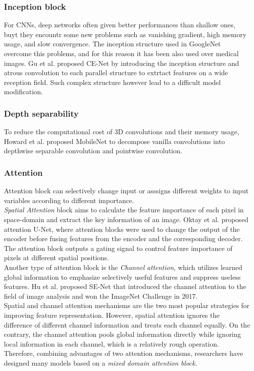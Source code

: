 \subsubsection{Inception block}
For CNNs, deep networks often given better performances than shallow ones, buyt they encountr some new problems such as vanishing gradient, high memory usage, and slow convergence. The inception structure used in GoogleNet overcome this problems, and for this reason it has been also used over medical images. Gu et al. proposed CE-Net by introducing the inception structure and atrous convolution to each parallel structure to extrtact features on a wide reception field. Such complex structure however lead to a difficult model modification.

\subsubsection{Depth separability}
To reduce the computational cost of 3D convolutions and their memory usage,
Howard et al. proposed MobileNet to decompose vanilla convolutions into
depthwise separable convolution and pointwise convolution.

\subsubsection{Attention}
\par
Attention block can selectively change input or asssigns different weights to
input variables according to different importance.\\
\emph{Spatial Attention} block aims
to calculate the feature importance of each pixel in space-domain and extract
the key information of an image. Oktay et al. proposed attention U-Net, where
attention blocks were used to change the output of the encoder before fusing
features from the encoder and the corresponding decoder. The attention block
outputs a gating signal to control feature importance of pixels at different
spatial positions.\\
Another type of attention block is the \emph{Channel attention},
which utilizes learned global information to emphasize selectively useful
features and suppress useless features. Hu et al. proposed SE-Net that
introduced the channel attention to the field of image analysis and won the
ImageNet Challenge in 2017.\\
Spatial and channel attention mechanisms are the two most popular strategies for
improving feature representation. However, spatial attention ignores the
difference of different channel information and treats each channel equally. On
the contrary, the channel attention pools global information directly while
ignoring local information in each channel, which is a relatively rough
operation. Therefore, combining advantages of two attention mechanisms,
researchers have designed many models based on a \emph{mixed domain attention block}.

